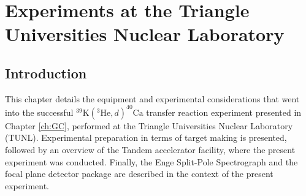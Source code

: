 \chapter{Experiments at the Triangle Universities Nuclear Laboratory} 
\label{ch:exp}




\section{Introduction}

This chapter details the equipment and experimental considerations that went into the successful $^{39}\mathrm{K}(^{3}\mathrm{He},d)^{40}\mathrm{Ca}$ transfer reaction experiment presented in Chapter \ref{ch:GC}, performed at the Triangle Universities Nuclear Laboratory (TUNL). Experimental preparation in terms of target making is presented, followed by an overview of the Tandem accelerator facility, where the present experiment was conducted. Finally, the Enge Split-Pole Spectrograph and the focal plane detector package are described in the context of the present experiment.

